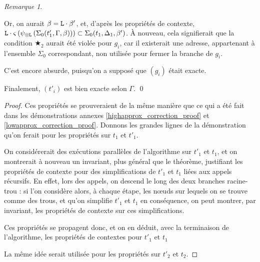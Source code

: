 \documentclass[11pt,a4paper]{article}
\theoremstyle{plain}
\theoremstyle{definition}
\theoremstyle{remark}
\newtheorem{remark}{Remarque}
\newcommand*{\tensor}{\otimes}
\newcommand*{\someperm}{\varsigma}
\newcommand*{\sequent}{\Gamma}
\newcommand*{\sequentbis}{\Delta}
\newcommand*{\Left}{\textnormal{\texttt{L}}}
\newcommand*{\lowapprox}{\ensuremath{\Sigma_0}}
\newcommand*{\exactcondbis}{\bigstar_2}
\begin{document}
\begin{remark}
\begin{itemize}
            Or, on aurait $\beta = \Left \cdot \beta'$, et, d'après les propriétés de contexte, $\Left \cdot \someperm \left( \psi_{\tensor\Left} \left(\lowapprox(t'_1, \sequent, \beta)\right) \right) \subset \lowapprox(t_1, \sequentbis_1, \beta')$. À nouveau, cela signifierait que la condition $\exactcondbis$ aurait été violée pour $g_i$, car il existerait une adresse, appartenant à l'ensemble $\lowapprox$ correspondant, non utilisée pour fermer la branche de $g_i$. 
            
            C'est encore absurde, puisqu'on a supposé que $(g_i)$ était exacte.
    \end{itemize}

    Finalement, $(t'_i)$ est bien exacte selon $\sequent$. \qed
\end{remark}

\begin{proof}
    Ces propriétés se prouveraient de la même manière que ce qui a été fait dans les démonstrations annexes \ref{highapprox_correction_proof} et \ref{lowapprox_correction_proof}. Donnons les grandes lignes de la démonstration qu'on ferait pour les propriétés sur $t_1$ et $t'_1$. 
    
    On considérerait des exécutions parallèles de l'algorithme sur $t'_1$ et $t_1$, et on montrerait à nouveau un invariant, plus général que le théorème, justifiant les propriétés de contexte pour des simplifications de $t'_1$ et $t_1$ liées aux appels récursifs. En effet, lors des appels, on descend le long des deux branches racine-trou : si l'on considère alors, à chaque étape, les n\oe uds sur lequels on se trouve comme des trous, et qu'on simplifie $t'_1$ et $t_1$ en conséquence, on peut montrer, par invariant, les propriétés de contexte sur ces simplifications.

    Ces propriétés se propagent donc, et on en déduit, avec la terminaison de l'algorithme, les propriétés de contextes pour $t'_1$ et $t_1$
    
    La même idée serait utilisée pour les propriétés sur $t'_2$ et $t_2$.
\end{proof}
\end{document}
